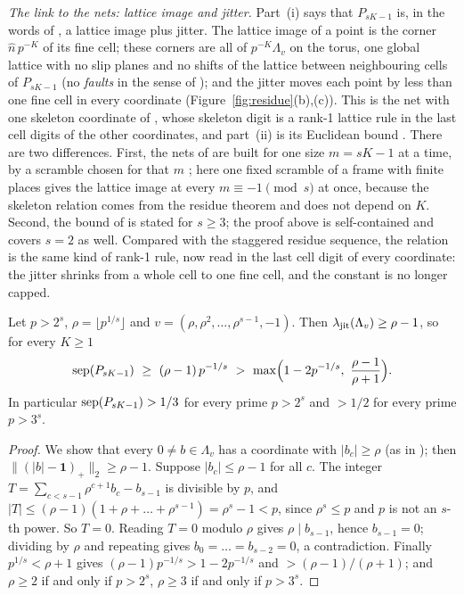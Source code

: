 \emph{The link to the nets: lattice image and jitter.} Part~(i) says that $P_{sK-1}$ is, in the words of \cite{Gru26geo}, a lattice image plus jitter. The lattice image of a point is the corner $\hat n\,p^{-K}$ of its fine cell; these corners are all of $p^{-K}\Lambda_v$ on the torus, one global lattice with no slip planes and no shifts of the lattice between neighbouring cells of $P_{sK-1}$ (no \emph{faults} in the sense of \cite{Gru26geo}); and the jitter moves each point by less than one fine cell in every coordinate (Figure~\ref{fig:residue}(b),(c)). This is the net with one skeleton coordinate of \cite{Gru26geo}%
, whose skeleton digit is a rank-1 lattice rule in the last cell digits of the other coordinates, and part~(ii) is its Euclidean bound \cite{Gru26geo}%
. There are two differences. First, the nets of \cite{Gru26geo} are built for one size $m=sK-1$ at a time, by a scramble chosen for that $m$%
; here one fixed scramble of a frame with finite places gives the lattice image at every $m\equiv-1\pmod s$ at once, because the skeleton relation comes from the residue theorem and does not depend on $K$. Second, the bound of \cite{Gru26geo} is stated for $s\ge3$; the proof above is self-contained and covers $s=2$ as well. Compared with the staggered residue sequence, the relation is the same kind of rank-1 rule, now read in the last cell digit of every coordinate: the jitter shrinks from a whole cell to one fine cell, and the constant is no longer capped.

\begin{corollary}\label{cor:korobov}
Let $p>2^s$, $\rho=\lfloor p^{1/s}\rfloor$ and $v=(\rho,\rho^2,\dots,\rho^{s-1},-1)$. Then $\lambda_{\mathrm{jit}}(\Lambda_v)\ge\rho-1$, so for every $K\ge1$
\[
\sep{P_{sK-1}}\ \ge\ (\rho-1)\,p^{-1/s}\ >\ \max\Bigl(1-2p^{-1/s},\ \frac{\rho-1}{\rho+1}\Bigr).
\]
In particular $\operatorname{sep}(P_{sK-1})>1/3$ for every prime $p>2^s$ and $>1/2$ for every prime $p>3^s$.
\end{corollary}

\begin{proof}
We show that every $0\ne b\in\Lambda_v$ has a coordinate with $|b_c|\ge\rho$ (as in \cite{Gru26geo}%
); then $\|(|b|-\mathbf 1)_+\|_2\ge\rho-1$. Suppose $|b_c|\le\rho-1$ for all $c$. The integer $T=\sum_{c<s-1}\rho^{c+1}b_c-b_{s-1}$ is divisible by $p$, and $|T|\le(\rho-1)(1+\rho+\dots+\rho^{s-1})=\rho^s-1<p$, since $\rho^s\le p$ and $p$ is not an $s$-th power. So $T=0$. Reading $T=0$ modulo $\rho$ gives $\rho\mid b_{s-1}$, hence $b_{s-1}=0$; dividing by $\rho$ and repeating gives $b_0=\dots=b_{s-2}=0$, a contradiction. Finally $p^{1/s}<\rho+1$ gives $(\rho-1)p^{-1/s}>1-2p^{-1/s}$ and $>(\rho-1)/(\rho+1)$; and $\rho\ge2$ if and only if $p>2^s$, $\rho\ge3$ if and only if $p>3^s$.
\end{proof}

